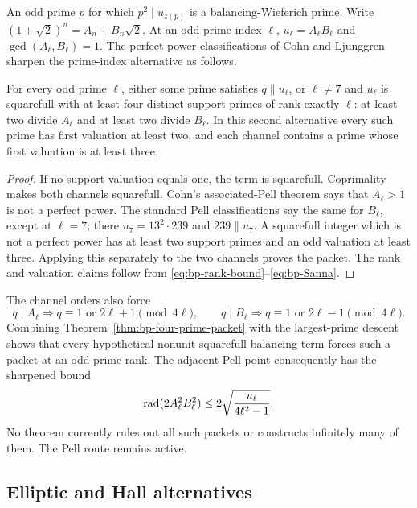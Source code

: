 An odd prime $p$ for which $p^2\mid u_{z(p)}$ is a balancing-Wieferich prime.
Write $(1+\sqrt2)^n=A_n+B_n\sqrt2$.  At an odd prime index $\ell$,
$u_\ell=A_\ell B_\ell$ and $\gcd(A_\ell,B_\ell)=1$.  The perfect-power
classifications of Cohn and Ljunggren~\cite{Cohn1996Pell,Cohn2003Pell,Ljunggren1942}
sharpen the prime-index alternative as follows.

\begin{theorem}
\label{thm:bp-four-prime-packet}
For every odd prime $\ell$, either some prime satisfies
$q\parallel u_\ell$, or $\ell\ne7$ and $u_\ell$ is squarefull with at least
four distinct support primes of rank exactly $\ell$: at least two divide
$A_\ell$ and at least two divide $B_\ell$.  In this second alternative every
such prime has first valuation at least two, and each channel contains a prime
whose first valuation is at least three.
\end{theorem}

\begin{proof}
If no support valuation equals one, the term is squarefull.  Coprimality makes
both channels squarefull.  Cohn's associated-Pell theorem says that
$A_\ell>1$ is not a perfect power.  The standard Pell classifications say the
same for $B_\ell$, except at $\ell=7$; there
$u_7=13^2\cdot239$ and $239\parallel u_7$.  A squarefull integer which is not
a perfect power has at least two support primes and an odd valuation at least
three.  Applying this separately to the two channels proves the packet.
The rank and valuation claims follow from
\eqref{eq:bp-rank-bound}--\eqref{eq:bp-Sanna}.
\end{proof}

The channel orders also force
\[
 q\mid A_\ell\Longrightarrow q\equiv1\text{ or }2\ell+1\pmod{4\ell},
 \qquad
 q\mid B_\ell\Longrightarrow q\equiv1\text{ or }2\ell-1\pmod{4\ell}.
\]
Combining Theorem~\ref{thm:bp-four-prime-packet} with the largest-prime
descent shows that every hypothetical nonunit squarefull balancing term forces
such a packet at an odd prime rank.  The adjacent Pell point consequently has
the sharpened bound
\begin{equation}\label{eq:bp-channel-radical}
 \operatorname{rad}(2A_\ell^2B_\ell^2)
 \leq 2\sqrt{\frac{u_\ell}{4\ell^2-1}}.
\end{equation}
No theorem currently rules out all such packets or constructs infinitely many
of them.  The Pell route remains active.

\subsection{Elliptic and Hall alternatives}

